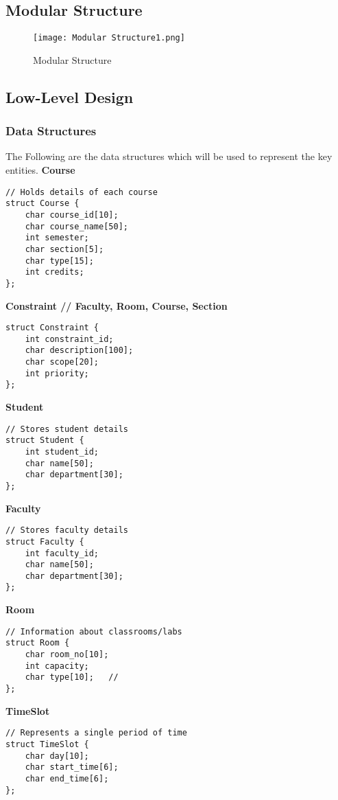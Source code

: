 \documentclass[12pt]{article}
\begin{document}
\subsection{Modular Structure}
\begin{figure}[H]
    \centering
    \texttt{[image: Modular Structure1.png]}
    \caption{Modular Structure}
    \label{fig:placeholder}
\end{figure}
\newpage
\subsection{Low-Level Design}
\subsubsection{Data Structures}
The Following are the data structures which will be used to represent the key entities.
\noindent\textbf{Course}
\begin{lstlisting}
// Holds details of each course
struct Course {
    char course_id[10];
    char course_name[50];
    int semester;
    char section[5];
    char type[15];   
    int credits;
};
\end{lstlisting}

\noindent\textbf{Constraint // Faculty, Room, Course, Section}
\begin{lstlisting}
struct Constraint {
    int constraint_id;
    char description[100];
    char scope[20];   
    int priority; 
};
\end{lstlisting}

\noindent\textbf{Student}
\begin{lstlisting}
// Stores student details
struct Student {
    int student_id;
    char name[50];
    char department[30];
};
\end{lstlisting}

\noindent\textbf{Faculty}
\begin{lstlisting}
// Stores faculty details
struct Faculty {
    int faculty_id;
    char name[50];
    char department[30];
};
\end{lstlisting}

\noindent\textbf{Room}
\begin{lstlisting}
// Information about classrooms/labs
struct Room {
    char room_no[10];
    int capacity;
    char type[10];   // 
};
\end{lstlisting}

\noindent\textbf{TimeSlot}
\begin{lstlisting}
// Represents a single period of time
struct TimeSlot {
    char day[10];       
    char start_time[6];  
    char end_time[6];    
};
\end{lstlisting}
\end{document}
